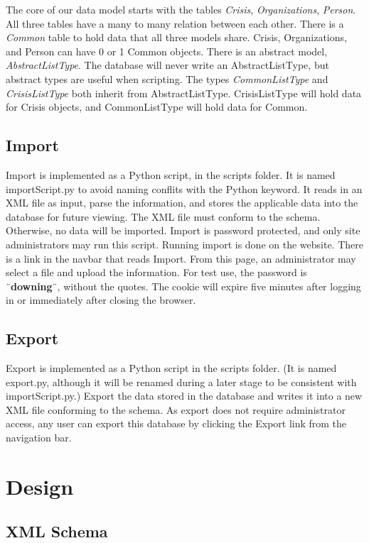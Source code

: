 \documentclass[12pt]{report}
\begin{document}
The core of our data model starts with the tables \emph{Crisis}, \emph{Organizations}, \emph{Person}.
All three tables have a many to many relation between each other.
There is a \emph{Common} table to hold data that all three models share.
Crisis, Organizations, and Person can have 0 or 1 Common objects.
There is an abstract model, \emph{AbstractListType}.
The database will never write an AbstractListType, but abstract types are useful when scripting.
The types \emph{CommonListType} and \emph{CrisisListType} both inherit from AbstractListType.
CrisisListType will hold data for Crisis objects, and CommonListType will hold data for Common.


\subsection*{Import}
\hfill


Import is implemented as a Python script, in the scripts folder.
It is named importScript.py to avoid naming conflits with the Python keyword.
It reads in an XML file as input, parse the information, and stores the applicable data into the database for future viewing.
The XML file must conform to the schema.
Otherwise, no data will be imported.
Import is password protected, and only site administrators may run this script.
Running import is done on the website.
There is a link in the navbar that reads Import.
From this page, an administrator may select a file and upload the information.
For test use, the password is ¨\textbf{downing}¨, without the quotes.
The cookie will expire five minutes after logging in or immediately after closing the browser.


\subsection*{Export}
\hfill


Export is implemented as a Python script in the scripts folder.
(It is named export.py, although it will be renamed during a later stage to be consistent with importScript.py.)
Export the data stored in the database and writes it into a new XML file conforming to the schema.
As export does not require administrator access, any user can export this database by clicking the Export link from the navigation bar.


\newpage
\section*{Design}
\subsection*{XML Schema}
\hfill
\end{document}
